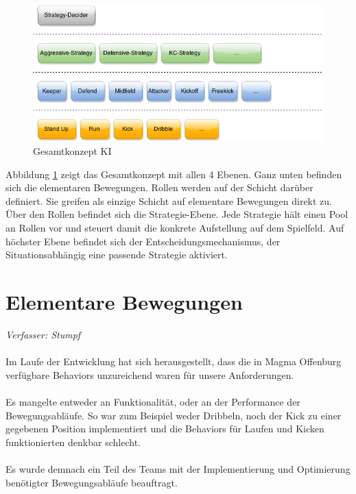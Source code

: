 \documentclass[fontsize=12pt,a4paper,final]{scrartcl}[2003/01/01]
\begin{document}
\begin{figure}[H]
	\centering
	\includegraphics[width=1.0\textwidth]{Grafiken/KI/Ki-Concept}
	\caption{Gesamtkonzept KI}
	\label{Gesamtkonzept KI}
\end{figure}

Abbildung \ref{Gesamtkonzept KI} zeigt das Gesamtkonzept mit allen 4 Ebenen. Ganz unten befinden sich die elementaren Bewegungen. Rollen werden auf der Schicht darüber definiert. Sie greifen als einzige Schicht auf elementare Bewegungen direkt zu. Über den Rollen befindet sich die Strategie-Ebene. Jede Strategie hält einen Pool an Rollen vor und steuert damit die konkrete Aufstellung auf dem Spielfeld. Auf höchster Ebene befindet sich der Entscheidungsmechanismus, der Situationsabhängig eine passende Strategie aktiviert. 

\section{Elementare Bewegungen}\label{se:Elementare Bewegungen}
\textit{Verfasser: Stumpf}\\
\\
Im Laufe der Entwicklung hat sich herausgestellt, dass die in Magma Offenburg verfügbare Behaviors unzureichend waren für unsere Anforderungen.\\
\\
Es mangelte entweder an Funktionalität, oder an der Performance der Bewegungsabläufe. So war zum Beispiel weder Dribbeln, noch der Kick zu einer gegebenen Position implementiert und die Behaviors für Laufen und Kicken funktionierten denkbar schlecht.\\
\\
Es wurde demnach ein Teil des Teams mit der Implementierung und Optimierung benötigter Bewegungsabläufe beauftragt.
\end{document}

